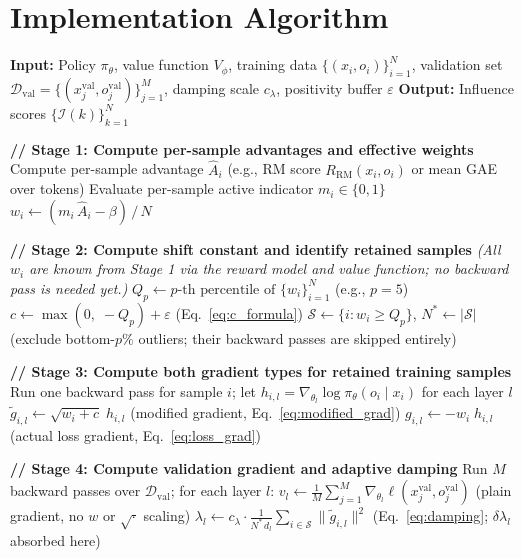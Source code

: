 \documentclass{article}
\begin{document}
\section{Implementation Algorithm}

\begin{algorithm}[H]
\caption{Influence Computation for Linearized PPO (DataInf)}
\begin{algorithmic}[1]
\STATE \textbf{Input:} Policy $\pi_\theta$, value function $V_\phi$, training data $\{(x_i,o_i)\}_{i=1}^N$, validation set $\mathcal{D}_{\mathrm{val}} = \{(x_j^{\mathrm{val}},o_j^{\mathrm{val}})\}_{j=1}^M$, damping scale $c_\lambda$, positivity buffer $\varepsilon$
\STATE \textbf{Output:} Influence scores $\{\mathcal{I}(k)\}_{k=1}^N$

\STATE
\STATE \textbf{// Stage 1: Compute per-sample advantages and effective weights}
    \STATE Compute per-sample advantage $\hat{A}_i$ (e.g., RM score $R_{\mathrm{RM}}(x_i,o_i)$ or mean GAE over tokens)
    \STATE Evaluate per-sample active indicator $m_i \in \{0,1\}$
    \STATE $w_i \leftarrow (m_i\,\hat{A}_i - \beta)\,/\,N$
\ENDFOR

\STATE
\STATE \textbf{// Stage 2: Compute shift constant and identify retained samples}
\STATE \textit{(All $w_i$ are known from Stage 1 via the reward model and value function; no backward pass is needed yet.)}
\STATE $Q_p \leftarrow p\text{-th percentile of }\{w_i\}_{i=1}^N$ \hfill (e.g., $p=5$)
\STATE $c \leftarrow \max(0,\;-Q_p) + \varepsilon$ \hfill (Eq.~\ref{eq:c_formula})
\STATE $\mathcal{S} \leftarrow \{i : w_i \ge Q_p\}$, \quad $N^* \leftarrow |\mathcal{S}|$ \hfill (exclude bottom-$p\%$ outliers; their backward passes are skipped entirely)

\STATE
\STATE \textbf{// Stage 3: Compute both gradient types for retained training samples}
    \STATE Run one backward pass for sample $i$; let $h_{i,l} = \nabla_{\theta_l}\log\pi_\theta(o_i\mid x_i)$ for each layer $l$
    \STATE \hspace{1em} $\tilde{g}_{i,l} \leftarrow \sqrt{w_i+c}\;h_{i,l}$ \hfill (modified gradient, Eq.~\ref{eq:modified_grad})
    \STATE \hspace{1em} $g_{i,l} \leftarrow -w_i\;h_{i,l}$ \hfill (actual loss gradient, Eq.~\ref{eq:loss_grad})
\ENDFOR

\STATE
\STATE \textbf{// Stage 4: Compute validation gradient and adaptive damping}
\STATE Run $M$ backward passes over $\mathcal{D}_{\mathrm{val}}$; for each layer $l$:
\STATE \hspace{1em} $v_l \leftarrow \frac{1}{M}\sum_{j=1}^{M}\nabla_{\theta_l}\ell(x_j^{\mathrm{val}},o_j^{\mathrm{val}})$ \hfill (plain gradient, no $w$ or $\sqrt{\cdot}$ scaling)
    \STATE $\lambda_l \leftarrow c_\lambda \cdot \frac{1}{N^*\,d_l}\sum_{i\in\mathcal{S}}\|\tilde{g}_{i,l}\|^2$
    \hfill (Eq.~\ref{eq:damping}; $\delta\lambda_l$ absorbed here)
\ENDFOR


\end{algorithmic}
\end{algorithm}
\end{document}

